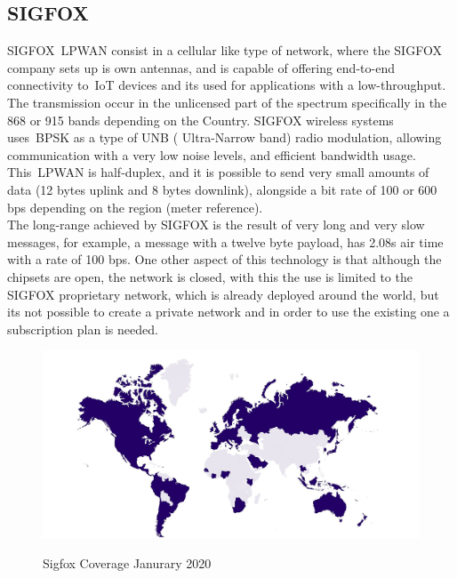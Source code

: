 


\newpage
\subsection{SIGFOX} %
\label{sec:SIGFOX_sota}

SIGFOX~\gls{LPWAN} consist in a cellular like type of network, where the SIGFOX company sets up is own antennas, and is capable of offering end-to-end connectivity to~\gls{IoT} devices and its used  for applications with a low-throughput. The transmission occur in the unlicensed part of the spectrum specifically in the 868 or 915 bands depending on the Country. SIGFOX wireless systems uses~\gls{BPSK} as a type of UNB ( Ultra-Narrow band) radio modulation, allowing communication with a very low noise levels, and efficient bandwidth usage. This~\gls{LPWAN} is half-duplex, and it is possible to send very small amounts of data (12 bytes uplink and 8 bytes downlink), alongside a bit rate of 100 or 600 bps depending on the region (meter reference). \\The long-range achieved by SIGFOX is the result of very long and very slow messages, for example, a message with a twelve byte payload, has 2.08s air time  with a rate of 100 bps. One other aspect of this technology is that although the chipsets are open, the network is closed, with this the use is limited to the SIGFOX proprietary network, which is already deployed around the world, but its not possible to create a private network and in order to use the existing one a subscription plan is needed.\newline
\begin{figure}[htbp]
  \centering
  
    {\includegraphics[width=0.9\linewidth]{Chapters/Figures/coverage-map-jan-20.jpg}}%
 
  \caption{Sigfox Coverage Janurary 2020~\cite{SIGSITE}}
  \label{fig:Sigfox_Coverage}
\end{figure}\newline

